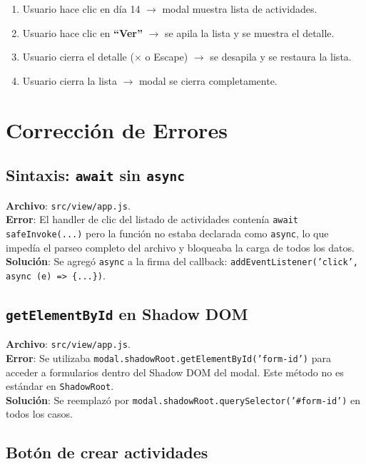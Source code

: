 \documentclass[12pt,a4paper]{article}
\begin{document}
\begin{enumerate}[leftmargin=*]
    \item Usuario hace clic en día 14 $\rightarrow$ modal muestra lista de actividades.
    \item Usuario hace clic en \textbf{``Ver''} $\rightarrow$ se apila la lista y se muestra el detalle.
    \item Usuario cierra el detalle ($\times$ o Escape) $\rightarrow$ se desapila y se restaura la lista.
    \item Usuario cierra la lista $\rightarrow$ modal se cierra completamente.
\end{enumerate}

\section{Corrección de Errores}

\subsection{Sintaxis: \texttt{await} sin \texttt{async}}

\textbf{Archivo}: \texttt{src/view/app.js}.\\
\textbf{Error}: El handler de clic del listado de actividades contenía \texttt{await safeInvoke(...)} pero la función no estaba declarada como \texttt{async}, lo que impedía el parseo completo del archivo y bloqueaba la carga de todos los datos.\\
\textbf{Solución}: Se agregó \texttt{async} a la firma del callback: \texttt{addEventListener('click', async (e) => \{...\})}.

\subsection{\texttt{getElementById} en Shadow DOM}

\textbf{Archivo}: \texttt{src/view/app.js}.\\
\textbf{Error}: Se utilizaba \texttt{modal.shadowRoot.getElementById('form-id')} para acceder a formularios dentro del Shadow DOM del modal. Este método no es estándar en \texttt{ShadowRoot}.\\
\textbf{Solución}: Se reemplazó por \texttt{modal.shadowRoot.querySelector('\#form-id')} en todos los casos.

\subsection{Botón de crear actividades}
\end{document}
